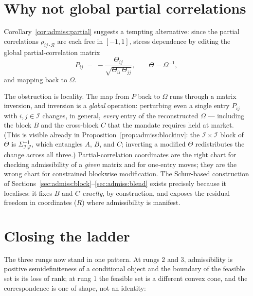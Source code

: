 \section{Why not global partial correlations}\label{sec:admiss:global}

Corollary~\ref{cor:admiss:partial} suggests a tempting alternative: since
the partial correlations $\rho_{ij \cdot \mathcal{R}}$ are each free in
$[-1, 1]$, stress dependence by editing the global
partial-correlation matrix
\[
  P_{ij} \;=\; -\frac{\Theta_{ij}}{\sqrt{\Theta_{ii}\, \Theta_{jj}}},
  \qquad \Theta = \Omega^{-1},
\]
and mapping back to $\Omega$.

The obstruction is locality. The map from $P$ back to $\Omega$ runs through
a matrix inversion, and inversion is a \emph{global} operation: perturbing
even a single entry $P_{ij}$ with $i, j \in \mathcal I$ changes, in
general, \emph{every} entry of the reconstructed $\Omega$ --- including the
block $B$ and the cross-block $C$ that the mandate requires held at
market. (This is visible already in Proposition~\ref{prop:admiss:blockinv}:
the $\mathcal I \times \mathcal I$ block of $\Theta$ is
$\Sigma_{\mathcal I|\mathcal J}^{-1}$, which entangles $A$, $B$, and $C$;
inverting a modified $\Theta$ redistributes the change across all three.)
Partial-correlation coordinates are the right chart for checking
admissibility of a \emph{given} matrix and for one-entry moves; they are
the wrong chart for constrained blockwise modification. The Schur-based
construction of Sections~\ref{sec:admiss:block}--\ref{sec:admiss:blend}
exists precisely because it localises: it fixes $B$ and $C$ \emph{exactly},
by construction, and exposes the residual freedom in coordinates ($R$)
where admissibility is manifest.

\section{Closing the ladder}\label{sec:admiss:closing}

The three rungs now stand in one pattern. At rungs 2 and 3, admissibility
is positive semidefiniteness of a conditional object and the boundary of
the feasible set is its loss of rank; at rung 1 the feasible set is a
different convex cone, and the correspondence is one of shape, not an
identity:

